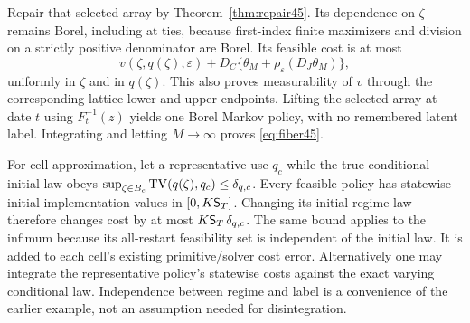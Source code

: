 Repair that selected array by Theorem~\ref{thm:repair45}. Its dependence on $\zeta$ remains Borel, including at ties, because first-index finite maximizers and division on a strictly positive denominator are Borel. Its feasible cost is at most
\[
 v(\zeta,q(\zeta),\varepsilon)+D_C\{\theta_M+\rho_\varepsilon(D_J\theta_M)\},
\]
uniformly in $\zeta$ and in $q(\zeta)$. This also proves measurability of $v$ through the corresponding lattice lower and upper endpoints. Lifting the selected array at date $t$ using $F_t^{-1}(z)$ yields one Borel Markov policy, with no remembered latent label. Integrating and letting $M\to\infty$ proves \eqref{eq:fiber45}.

For cell approximation, let a representative use $q_c$ while the true conditional initial law obeys $\sup_{\zeta\in B_c}\operatorname{TV}(q(\zeta),q_c)\le\delta_{q,c}$. Every feasible policy has statewise initial implementation values in $[0,K\mathsf S_{T}]$. Changing its initial regime law therefore changes cost by at most $K\mathsf S_{T}\,\delta_{q,c}$. The same bound applies to the infimum because its all-restart feasibility set is independent of the initial law. It is added to each cell's existing primitive/solver cost error. Alternatively one may integrate the representative policy's statewise costs against the exact varying conditional law. Independence between regime and label is a convenience of the earlier example, not an assumption needed for disintegration.
